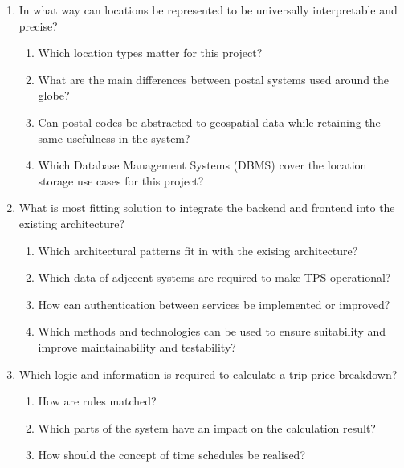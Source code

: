 \begin{enumerate}

	\item In what way can locations be represented to be universally interpretable and precise?
		\begin{enumerate}[label*=\arabic*.]
			\item Which location types matter for this project?
			\item What are the main differences between postal systems used around the globe?
			\item Can postal codes be abstracted to geospatial data while retaining the same usefulness in the system?
			\item Which Database Management Systems (DBMS) cover the location storage use cases for this project?
		\end{enumerate}

	\item What is most fitting solution to integrate the backend and frontend into the existing architecture?
		\begin{enumerate}[label*=\arabic*.]
			\item Which architectural patterns fit in with the exising architecture?
			\item Which data of adjecent systems are required to make TPS operational?
			\item How can authentication between services be implemented or improved?
			\item Which methods and technologies can be used to ensure suitability and improve maintainability and testability?
		\end{enumerate}

	\item Which logic and information is required to calculate a trip price breakdown?
		\begin{enumerate}[label*=\arabic*.]
			\item How are rules matched?
			\item Which parts of the system have an impact on the calculation result?
			\item How should the concept of time schedules be realised?
		\end{enumerate}


\end{enumerate}
